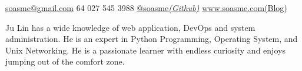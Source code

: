 \documentclass[10pt,a4paper]{article} %
\begin{document}


\noindent\href{mailto:soasme@gmail.com}{soasme@gmail.com}\bull
\textsmaller{+}64 027 545 3988\bull 
\href{https://github.com/soasme}{@soasme\textit{(Github)}}\bull
\href{http://www.soasme.com}{www.soasme.com(Blog)}\\ %
\spacedhrule{0.9em}{-0.4em} %



\vspace{-1.3em} %

\begin{multicols}{2}  %
  Ju Lin has a wide knowledge of web application, DevOps and system administration. He is an expert in Python Programming, Operating System, and Unix Networking. He is a passionate learner with endless curiosity and enjoys jumping out of the comfort zone.
\end{multicols}

\spacedhrule{0.5em}{-0.4em} %


\end{document}
